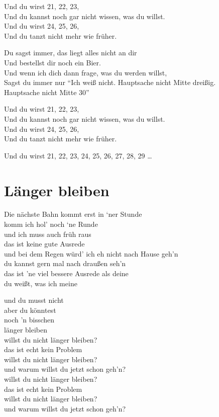 \documentclass[]{book}
\begin{document}
Und du wirst 21, 22, 23,\\
Und du kannst noch gar nicht wissen, was du willst.\\
Und du wirst 24, 25, 26,\\
Und du tanzt nicht mehr wie früher.

Du sagst immer, das liegt alles nicht an dir\\
Und bestellst dir noch ein Bier.\\
Und wenn ich dich dann frage, was du werden willst,\\
Sagst du immer nur ``Ich weiß nicht. Hauptsache nicht Mitte dreißig.\\
Hauptsache nicht Mitte 30''

Und du wirst 21, 22, 23,\\
Und du kannst noch gar nicht wissen, was du willst.\\
Und du wirst 24, 25, 26,\\
Und du tanzt nicht mehr wie früher.

Und du wirst 21, 22, 23, 24, 25, 26, 27, 28, 29 \ldots{}

\hypertarget{langer-bleiben}{%
\section{Länger bleiben}\label{langer-bleiben}}

Die nächste Bahn kommt erst in `ner Stunde\\
komm ich hol' noch `ne Runde\\
und ich muss auch früh raus\\
das ist keine gute Ausrede\\
und bei dem Regen würd' ich eh nicht nach Hause geh'n\\
du kannst gern mal nach draußen seh'n\\
das ist 'ne viel bessere Ausrede als deine\\
du weißt, was ich meine

und du musst nicht\\
aber du könntest\\
noch 'n bisschen\\
länger bleiben\\
willst du nicht länger bleiben?\\
das ist echt kein Problem\\
willst du nicht länger bleiben?\\
und warum willst du jetzt schon geh'n?\\
willst du nicht länger bleiben?\\
das ist echt kein Problem\\
willst du nicht länger bleiben?\\
und warum willst du jetzt schon geh'n?
\end{document}
